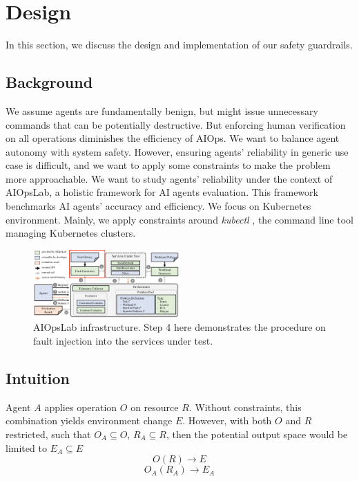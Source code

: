 \section{Design}

In this section, we discuss the design and implementation of our safety guardrails.

\subsection{Background}

We assume agents are fundamentally benign, but might issue unnecessary commands that can be potentially destructive. But enforcing human verification on all operations diminishes the efficiency of AIOps. We want to balance agent autonomy with system safety. However, ensuring agents' reliability in generic use case is difficult, and we want to apply some constraints to make the problem more approachable. We want to study agents' reliability under the context of AIOpsLab, a holistic framework for AI agents evaluation. This framework benchmarks AI agents' accuracy and efficiency. We focus on Kubernetes environment. Mainly, we apply constraints around \textit{kubectl} \cite{Kubernetes_2024}, the command line tool managing Kubernetes clusters. 

\begin{figure}[htbp]
    \centering
    \includegraphics[width=0.5\textwidth]{fig1.png}
    \caption{AIOpsLab infrastructure. Step 4 here demonstrates the procedure on fault injection into the services under test.}
    \label{fig:example}
\end{figure}

\subsection{Intuition}

Agent $A$ applies operation $O$ on resource $R$. Without constraints, this combination yields environment change $E$. However, with both $O$ and $R$ restricted, such that $O_A \subseteq O$, $R_A \subseteq R$, then the potential output space would be limited to $E_A \subseteq E$
\[ O(R) \rightarrow E \]
\[ O_A(R_A) \rightarrow E_A \]

